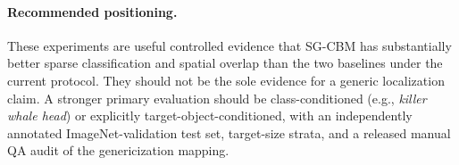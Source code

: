 \paragraph{Recommended positioning.}
These experiments are useful controlled evidence that SG-CBM has substantially
better sparse classification and spatial overlap than the two baselines under
the current protocol.  They should not be the sole evidence for a generic
localization claim.  A stronger primary evaluation should be class-conditioned
(e.g., \emph{killer whale head}) or explicitly target-object-conditioned, with
an independently annotated ImageNet-validation test set, target-size strata,
and a released manual QA audit of the genericization mapping.
